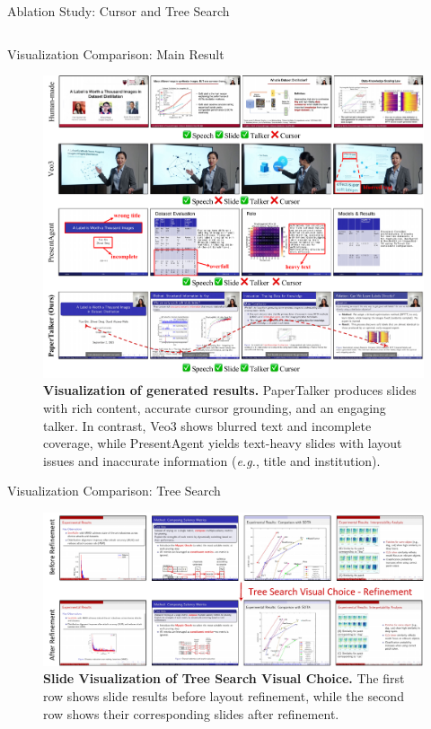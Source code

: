 \documentclass{beamer}
\begin{document}
\begin{frame}{Ablation Study: Cursor and Tree Search}
\begin{columns}[T]
\begin{column}{0.6\textwidth}
\begin{table}
    \end{table}
    \end{column}
  \end{columns}
\end{frame}

\begin{frame}{Visualization Comparison: Main Result}
  \begin{figure}
    \centering
    \includegraphics[width=0.7\linewidth]{figure/vis.pdf}
    \caption{\textbf{Visualization of generated results.} PaperTalker produces slides with rich content, accurate cursor grounding, and an engaging talker. In contrast, Veo3 shows blurred text and incomplete coverage, while PresentAgent yields text-heavy slides with layout issues and inaccurate information (\textit{e.g.}, title and institution).}
  \end{figure}
\end{frame}


\begin{frame}{Visualization Comparison: Tree Search}
 \begin{figure}
     \centering
     \includegraphics[width=1\linewidth]{figure/tree_search_vis.pdf}
     \caption{\textbf{Slide Visualization of Tree Search Visual Choice.} The first row shows slide results before layout refinement, while the second row shows their corresponding slides after refinement.}
     \label{fig:placeholder}
 \end{figure}
\end{frame}
\end{document}
